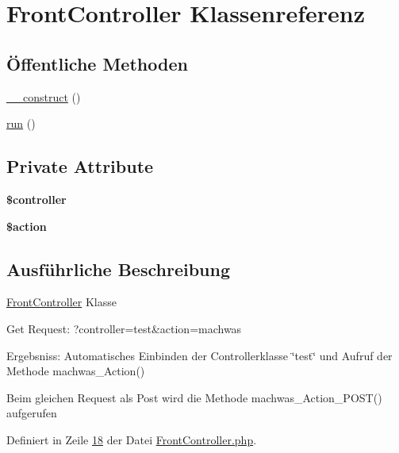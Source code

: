 \hypertarget{class_front_controller}{\section{Front\-Controller Klassenreferenz}
\label{class_front_controller}
}
\subsection*{Öffentliche Methoden}
\begin{DoxyCompactItemize}
\item 
\hyperlink{class_front_controller_ad0793ef177eb6e77a45a476567b531b2}{\-\_\-\-\_\-construct} ()
\item 
\hyperlink{class_front_controller_aee82b9818875d037d6312b856f76403c}{run} ()
\end{DoxyCompactItemize}
\subsection*{Private Attribute}
\begin{DoxyCompactItemize}
\item 
\hypertarget{class_front_controller_ac37e637f55efd166dfcce76240310cd3}{{\bfseries \$controller}}\label{class_front_controller_ac37e637f55efd166dfcce76240310cd3}

\item 
\hypertarget{class_front_controller_a281612757251bf7b0398826d6d9e1450}{{\bfseries \$action}}\label{class_front_controller_a281612757251bf7b0398826d6d9e1450}

\end{DoxyCompactItemize}


\subsection{Ausführliche Beschreibung}
\hyperlink{class_front_controller}{Front\-Controller} Klasse

Get Request\-: ?controller=test\&action=machwas

Ergebsniss\-: Automatisches Einbinden der Controllerklasse \char`\"{}test\char`\"{} und Aufruf der Methode machwas\-\_\-\-Action()

Beim gleichen Request als Post wird die Methode machwas\-\_\-\-Action\-\_\-\-P\-O\-S\-T() aufgerufen 

Definiert in Zeile \hyperlink{_front_controller_8php_source_l00018}{18} der Datei \hyperlink{_front_controller_8php_source}{Front\-Controller.\-php}.




